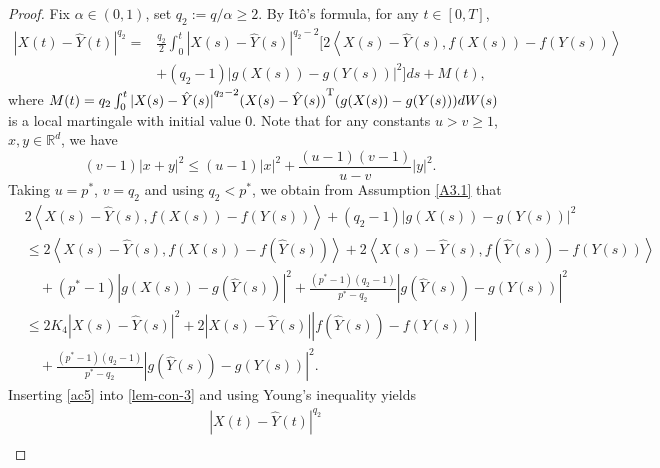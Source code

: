 \documentclass[preprint,12pt,compress]{elsarticle}
\begin{document}
\begin{proof}
Fix $\alpha \in (0,1)$, set $ q_2 := q/\alpha \ge 2$. By It\^o's formula, for any $t \in [0,T ]$, 
\begin{equation}   \label{lem-con-3}
	\begin{split}
		{\left| {X(t) - \hat Y(t)} \right|^{q_2}}=& \frac{{q_2}}{2}\int_0^t {{{\left| {X(s) - \hat Y(s)} \right|}^{{q_2} - 2}}\Big[ {2\left\langle {X(s) - \hat Y(s),f(X(s)) - f( Y(s))} \right\rangle } }  \\
		&{ + ({q_2} - 1){{\left| {g(X(s)) - g( Y(s))} \right|}^2}} \Big]ds 
		+ M(t) ,
	\end{split}
\end{equation}
where $M(t) = {q_2}\int_0^t {{{| {X(s) - \hat Y(s)} |}^{q_2 - 2}}{{( {X(s) - \hat Y(s)} )}^{\rm T}}( {g(X(s)) - g(Y(s))} )dW(s)} $ is a local martingale with initial value 0.
Note that for any constants $u > v \ge 1$, $x,y \in \mathbb{R}^d$, we have 
\begin{equation*}
	(v - 1){\left| {x + y} \right|^2} \le (u - 1){\left| x \right|^2} + \frac{{(u - 1)(v - 1)}}{{u - v}}{\left| y \right|^2}.
\end{equation*} 
Taking $u = p^*$, $v = q_2$ and using $q_2 < p^*$, we obtain from Assumption \ref{A3.1} that
\begin{equation}    \label{ac5}
	\begin{split}
		&2\left\langle {X(s) - \hat Y(s),f(X(s)) - f( Y(s))} \right\rangle  + (q_2 - 1){\left| {g(X(s)) - g( Y(s))} \right|^2} \\
		&\le 2\left\langle {X(s) - \hat Y(s),f(X(s)) - f(\hat Y(s))} \right\rangle  + 2\left\langle {X(s) - \hat Y(s),f(\hat Y(s)) - f( Y(s))} \right\rangle  \\
		&\quad+ ({p^*} - 1){\left| {g(X(s)) - g(\hat Y(s))} \right|^2} + \frac{{({p^*} - 1)(q_2 - 1)}}{{{p^*} - q_2}}{\left| {g(\hat Y(s)) - g( Y(s))} \right|^2} \\
		&\le 2{K_4}{\left| {X(s) - \hat Y(s)} \right|^2} + 2\left| {X(s) - \hat Y(s)} \right|\left| {f(\hat Y(s)) - f( Y(s))} \right| \\
		&\quad+ \frac{{({p^*} - 1)(q_2 - 1)}}{{{p^*} - q_2}}{\left| {g(\hat Y(s)) - g( Y(s))} \right|^2}.
	\end{split}
\end{equation}
Inserting \eqref{ac5} into \eqref{lem-con-3} and using Young's inequality yields
\begin{equation*} 
	\begin{split}
		&{\left| {X(t) - \hat Y(t)} \right|^{q_2}} \\

\end{split}
\end{equation*}
\end{proof}
\end{document}
